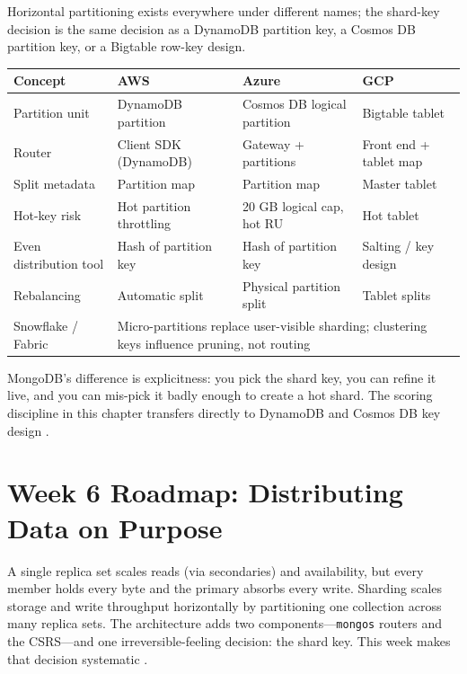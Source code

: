 \begin{crosscloud}
Horizontal partitioning exists everywhere under different names; the shard-key decision is the same decision as a DynamoDB partition key, a Cosmos DB partition key, or a Bigtable row-key design.

\vspace{2mm}
{\footnotesize
\begin{tabular}{@{}p{2.9cm}p{3.0cm}p{3.0cm}p{3.0cm}@{}} 
\toprule
\textbf{Concept} & \textbf{AWS} & \textbf{Azure} & \textbf{GCP} \\
\midrule
Partition unit & DynamoDB partition & Cosmos DB logical partition & Bigtable tablet \\
Router & Client SDK (DynamoDB) & Gateway + partitions & Front end + tablet map \\
Split metadata & Partition map & Partition map & Master tablet \\
Hot-key risk & Hot partition throttling & 20 GB logical cap, hot RU & Hot tablet \\
Even distribution tool & Hash of partition key & Hash of partition key & Salting / key design \\
Rebalancing & Automatic split & Physical partition split & Tablet splits \\
\addlinespace
Snowflake / Fabric & \multicolumn{3}{l}{Micro-partitions replace user-visible sharding; clustering keys influence pruning, not routing} \\
\bottomrule
\end{tabular}}

\vspace{1mm}
MongoDB's difference is explicitness: you pick the shard key, you can refine it live, and you can mis-pick it badly enough to create a hot shard. The scoring discipline in this chapter transfers directly to DynamoDB and Cosmos DB key design \cite{mongodbShardingDocs,cosmosPartitionDocs,dynamodbSingleTableDocs}.
\end{crosscloud}

\section{Week 6 Roadmap: Distributing Data on Purpose}
A single replica set scales reads (via secondaries) and availability, but every member holds every byte and the primary absorbs every write. Sharding scales storage and write throughput horizontally by partitioning one collection across many replica sets. The architecture adds two components---\texttt{mongos} routers and the CSRS---and one irreversible-feeling decision: the shard key. This week makes that decision systematic \cite{mongodbShardingDocs}.

